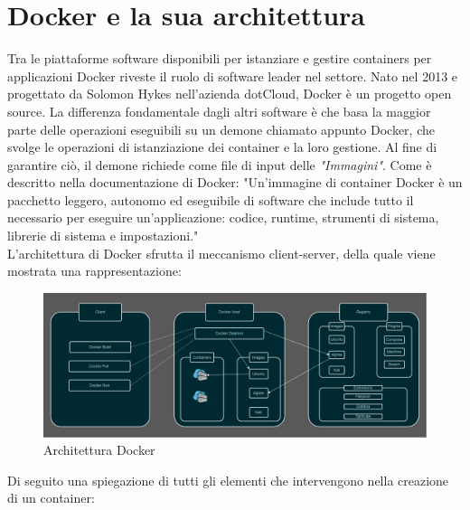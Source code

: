 \newpage

\section{Docker e la sua architettura}

Tra le piattaforme software disponibili per istanziare e gestire containers per applicazioni Docker riveste il ruolo di software leader nel settore.
Nato nel 2013 e progettato da Solomon Hykes nell'azienda dotCloud, Docker è un progetto open source. La differenza fondamentale dagli altri software è che
basa la maggior parte delle operazioni eseguibili su un demone chiamato appunto Docker, che svolge le operazioni di istanziazione dei container e la loro gestione.
Al fine di garantire ciò, il demone richiede come file di input delle \textit{"Immagini"}. Come è descritto nella documentazione di Docker\cite{docker-container}: 
"Un'immagine di container Docker è un pacchetto leggero, autonomo ed eseguibile di software che include tutto il necessario per eseguire un'applicazione: codice, runtime, strumenti di sistema, librerie di sistema e impostazioni."\\

L'architettura di Docker sfrutta il meccanismo client-server, della quale viene mostrata una rappresentazione:\\

\begin{figure}[h]  %
    \centering
    \includegraphics[width=1\textwidth]{Docker_Architecture.png}  %
    \caption{Architettura Docker}
    \label{fig:DockerArchitecture}
\end{figure}

Di seguito una spiegazione di tutti gli elementi che intervengono nella creazione di un container:

